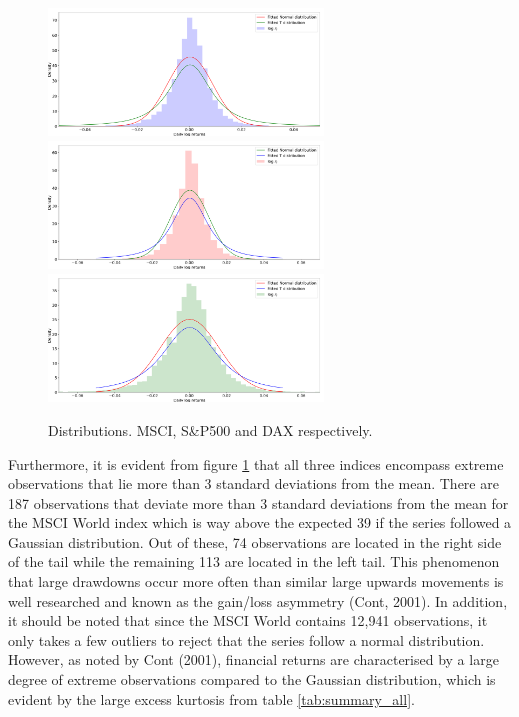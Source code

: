 \begin{figure}[H] 
    \centering
    \includegraphics[width=0.65\textwidth]{analysis/data_description/images/MSCI_distribution.png}
    \includegraphics[width=0.65\textwidth]{analysis/data_description/images/SP500_distribution.png}
    \includegraphics[width=0.65\textwidth]{analysis/data_description/images/DAX_distribution.png}
    \caption{Distributions. MSCI, S\&P500 and DAX respectively.}
    \label{fig: Kernel_distributions}
\end{figure}

Furthermore, it is evident from figure \ref{fig: Kernel_distributions} that all three indices encompass extreme observations that lie more than 3 standard deviations from the mean. There are 187 observations that deviate more than 3 standard deviations from the mean for the MSCI World index which is way above the expected 39 if the series followed a Gaussian distribution. Out of these, 74 observations are located in the right side of the tail while the remaining 113 are located in the left tail. This phenomenon that large drawdowns occur more often than similar large upwards movements is well researched and known as the gain/loss asymmetry (Cont, 2001). In addition, it should be noted that since the MSCI World contains 12,941 observations, it only takes a few outliers to reject that the series follow a normal distribution. However, as noted by Cont (2001), financial returns are characterised by a large degree of extreme observations compared to the Gaussian distribution, which is evident by the large excess kurtosis from table \ref{tab:summary_all}.


